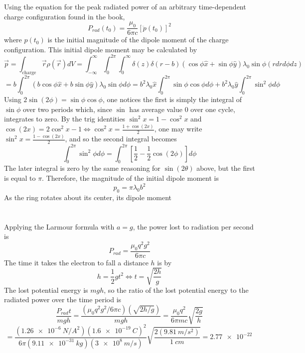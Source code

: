 \documentclass{article}
\begin{document}
\section{}
Using the equation for the peak radiated power of an arbitrary time-dependent charge configuration found in the book,
\[P_{rad}(t_{0})=\frac{\mu_{0}}{6\pi c}\left[ \ddot{p}(t_{0}) \right]^{2}\]
where $p(t_{0})$ is the initial magnitude of the dipole moment of the charge configuration.
This initial dipole moment may be calculated by
\[
  \vec{p}=\int_{\textrm{charge}} \vec{r}\rho(\vec{r})dV
  =\int_{-\infty}^{\infty}\int_{0}^{2\pi}\int_{0}^{\infty}\delta(z)\delta(r-b)(\cos\phi\hat{x}+\sin\phi\hat{y})
  \lambda_{0}\sin\phi(rdrd\phi dz)
\]
\[
  =b\int_{0}^{2\pi}(b\cos\phi\hat{x}+b\sin\phi\hat{y})\lambda_{0}\sin\phi d\phi
  =b^{2} \lambda_{0}\hat{x}\int_{0}^{2\pi}\sin\phi\cos\phi d\phi+b^{2}\lambda_{0}\hat{y}\int_{0}^{2\pi}\sin^{2}\phi d\phi
\]
Using $2\sin(2\phi)=\sin\phi\cos\phi$, one notices the first is simply the integral of $\sin\phi$ over two periods which,
since $\sin$ has average value $0$ over one cycle, integrates to zero.
By the trig identities $\sin^{2}x=1-\cos^{2}x$ and $\cos(2x)=2\cos^{2}x-1\Leftrightarrow \cos^{2}x=\frac{1+\cos(2x)}{2}$, one may write
$\sin^{2}x=\frac{1-\cos(2x)}{2}$, and so the second integral becomes
\[
  \int_{0}^{2\pi}\sin^{2}\phi d\phi=\int_{0}^{2\pi}\left[ \frac{1}{2}-\frac{1}{2}\cos(2\phi)\right]d\phi
\]
The later integral is zero by the same reasoning for $\sin(2\theta)$ above, but the first is equal to $\pi$.
Therefore, the magnitude of the initial dipole moment is
\[p_{0}=\pi\lambda_{0}b^{2}\]
As the ring rotates about its center, its dipole moment

\section{}
Applying the Larmour formula with $a=g$, the power lost to radiation per second is
\[P_{rad}=\frac{\mu_{0}q^{2}g^{2}}{6\pi c}\]
The time it takes the electron to fall a distance $h$ is by
\[h=\frac{1}{2}gt^{2}\Leftrightarrow t=\sqrt{\frac{2h}{g}}\]
The lost potential energy is $mgh$, so the ratio of the lost potential energy to the radiated power over the time period is
\[
  \frac{P_{rad}t}{mgh}
  =\frac{(\mu_{0}q^{2}g^{2}/6\pi c)(\sqrt{2h/g})}{mgh}
  =\frac{\mu_{0}q^{2}}{6\pi mc}\sqrt{\frac{2g}{h}}
\]
\[
  =\frac{(\SI{1.26e-6}{N/A^{2}})(\SI{1.6e-19}{C})^{2}}{6\pi(\SI{9.11e-31}{kg})(\SI{3e8}{m/s})}\sqrt{\frac{2(\SI{9.81}{m/s^{2}})}{\SI{1}{cm}}}
  =\SI{2.77e-22}{}
\]
\end{document}
